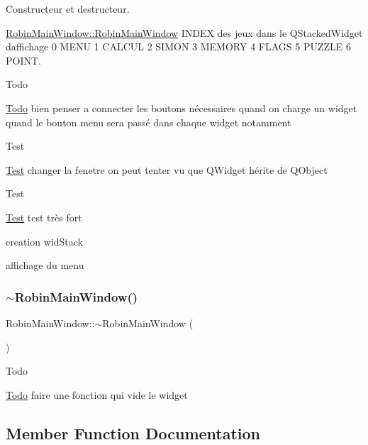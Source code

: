 Constructeur et destructeur. 

\hyperlink{class_robin_main_window_a55f7775f5daefb2099a51e97d50df666}{Robin\+Main\+Window\+::\+Robin\+Main\+Window} I\+N\+D\+EX des jeux dans le Q\+Stacked\+Widget d\textquotesingle{}affichage 0 M\+E\+NU 1 C\+A\+L\+C\+UL 2 S\+I\+M\+ON 3 M\+E\+M\+O\+RY 4 F\+L\+A\+GS 5 P\+U\+Z\+Z\+LE 6 P\+O\+I\+NT.

\begin{DoxyRefDesc}{Todo}
\item[\hyperlink{todo__todo000019}{Todo}]bien penser a connecter les boutons nécessaires quand on charge un widget quand le bouton menu sera passé dans chaque widget notamment \end{DoxyRefDesc}
\begin{DoxyRefDesc}{Test}
\item[\hyperlink{test__test000004}{Test}]changer la fenetre on peut tenter vu que Q\+Widget hérite de Q\+Object \end{DoxyRefDesc}


\begin{DoxyRefDesc}{Test}
\item[\hyperlink{test__test000005}{Test}]test très fort \end{DoxyRefDesc}


creation wid\+Stack

affichage du menu \mbox{\label{class_robin_main_window_a72eb8450efc1dfe22e2f36c7f728c5f3}} 
\subsubsection{\texorpdfstring{$\sim$\+Robin\+Main\+Window()}{~RobinMainWindow()}}
{\footnotesize\ttfamily Robin\+Main\+Window\+::$\sim$\+Robin\+Main\+Window (\begin{DoxyParamCaption}{ }\end{DoxyParamCaption})}

\begin{DoxyRefDesc}{Todo}
\item[\hyperlink{todo__todo000020}{Todo}]faire une fonction qui vide le widget \end{DoxyRefDesc}


\subsection{Member Function Documentation}
\mbox{\label{class_robin_main_window_a0850e17ae24394b14eb2dcfc4f15eeca}} 
